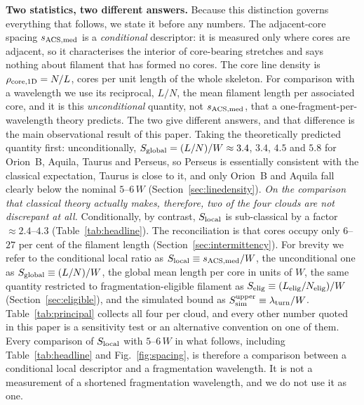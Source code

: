 \documentclass[usenatbib,twoside,twocolumn]{mnras}
\begin{document}
\smallskip\noindent\textbf{Two statistics, two different answers.} Because this distinction governs everything that follows, we state it before any numbers. The adjacent-core spacing $s_{\rm ACS,med}$ is a \emph{conditional} descriptor: it is measured only where cores are adjacent, so it characterises the interior of core-bearing stretches and says nothing about filament that has formed no cores. The core line density is $\rho_{\rm core,1D}=N/L$, cores per unit length of the whole skeleton. For comparison with a wavelength we use its reciprocal, $L/N$, the mean filament length per associated core, and it is this \emph{unconditional} quantity, not $s_{\rm ACS,med}$, that a one-fragment-per-wavelength theory predicts. The two give different answers, and that difference is the main observational result of this paper. Taking the theoretically predicted quantity first: unconditionally, $S_{\rm global}=(L/N)/W\approx3.4$, $3.4$, $4.5$ and $5.8$ for Orion~B, Aquila, Taurus and Perseus, so Perseus is essentially consistent with the classical expectation, Taurus is close to it, and only Orion~B and Aquila fall clearly below the nominal $5$--$6\,W$ (Section~\ref{sec:linedensity}). \emph{On the comparison that classical theory actually makes, therefore, two of the four clouds are not discrepant at all.} Conditionally, by contrast, $S_{\rm local}$ is sub-classical by a factor $\approx2.4$--$4.3$ (Table~\ref{tab:headline}). The reconciliation is that cores occupy only $6$--$27$ per cent of the filament length (Section~\ref{sec:intermittency}). For brevity we refer to the conditional local ratio as $S_{\rm local}\equiv s_{\rm ACS,med}/W$, the unconditional one as $S_{\rm global}\equiv(L/N)/W$, the global mean length per core in units of $W$, the same quantity restricted to fragmentation-eligible filament as $S_{\rm elig}\equiv(L_{\rm elig}/N_{\rm elig})/W$ (Section~\ref{sec:eligible}), and the simulated bound as $S_{\rm sim}^{\rm upper}\equiv\lambda_{\rm turn}/W$. Table~\ref{tab:principal} collects all four per cloud, and every other number quoted in this paper is a sensitivity test or an alternative convention on one of them. Every comparison of $S_{\rm local}$ with $5$--$6\,W$ in what follows, including Table~\ref{tab:headline} and Fig.~\ref{fig:spacing}, is therefore a comparison between a conditional local descriptor and a fragmentation wavelength. It is not a measurement of a shortened fragmentation wavelength, and we do not use it as one.
\end{document}
